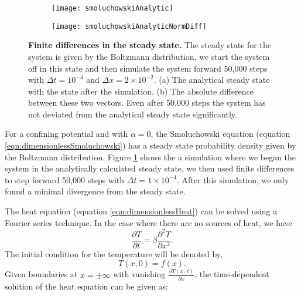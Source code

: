\begin{figure}
	\begin{subfigure}{0.49\textwidth}
	\texttt{[image: smoluchowskiAnalytic]}
	\end{subfigure}
	\begin{subfigure}{0.49\textwidth}
	\texttt{[image: smoluchowskiAnalyticNormDiff]}
	\end{subfigure}
	\caption{\textbf{Finite differences in the steady state.} The steady state for the system is given by the Boltzmann distribution, we start the system off in this state and then simulate the system forward 50,000 steps with $\Delta t = 10^{-4}$ and $\Delta x = 2 \times 10^{-2}$. (a) The analytical steady state with the state after the simulation. (b) The absolute difference between these two vectors. Even after 50,000 steps the system has not deviated from the analytical steady state significantly. \label{fig:smoluchowskiCompare}}
\end{figure}

For a confining potential and with $\alpha = 0$, the Smoluchowski equation (equation \ref{eqn:dimensionlessSmoluchowski}) has a steady state probability density given by the Boltzmann distribution.
Figure \ref{fig:smoluchowskiCompare} shows the a simulation where we began the system in the analytically calculated steady state, we then used finite differences to step forward 50,000 steps with $\Delta t = 1 \times 10^{-4}$. After this simulation, we only found a minimal divergence from the steady state.

The heat equation (equation \ref{eqn:dimensionlessHeat}) can be solved using a Fourier series technique. In the case where there are no sources of heat, we have
\begin{equation}
\frac{\partial T}{\partial t} = \beta \frac{\partial^2 T}{\partial x^2}.
\end{equation}
The initial condition for the temperature will be denoted by,
\begin{equation}
T(x, 0) = f(x).
\end{equation}
Given boundaries at $x=\pm \infty$ with vanishing $\frac{\partial T(x, \, t)}{\partial x}$, the time-dependent solution of the heat equation can be given as:

